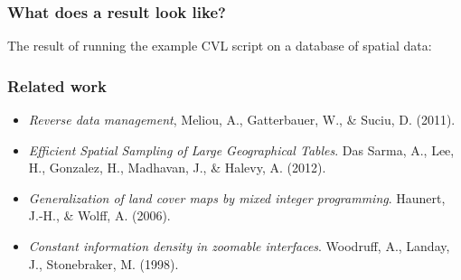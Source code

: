 \documentclass{beamer}
\begin{document}
\frame
{
  \frametitle{What does a result look like?}
  The result of running the example CVL script on a database of spatial data:\\
}


\frame
{
  \frametitle{Related work}

  \begin{itemize}
  \item \emph{Reverse data management}, Meliou, A., Gatterbauer, W., \& Suciu, D. (2011).
  \item \emph{Efficient Spatial Sampling of Large Geographical Tables}. Das Sarma, A., Lee, H., Gonzalez, H., Madhavan, J., \& Halevy, A. (2012).
  \item \emph{Generalization of land cover maps by mixed integer programming}. Haunert, J.-H., \& Wolff, A. (2006). 
  \item \emph{Constant information density in zoomable interfaces}. Woodruff, A., Landay, J., Stonebraker, M. (1998).
  \end{itemize}
}
\end{document}
